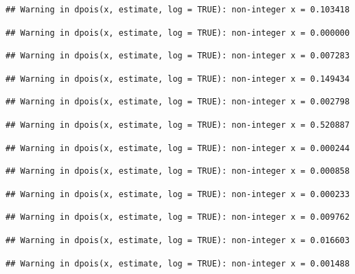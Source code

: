 \documentclass[]{article}
\begin{document}
\begin{verbatim}
## Warning in dpois(x, estimate, log = TRUE): non-integer x = 0.103418
\end{verbatim}

\begin{verbatim}
## Warning in dpois(x, estimate, log = TRUE): non-integer x = 0.000000
\end{verbatim}

\begin{verbatim}
## Warning in dpois(x, estimate, log = TRUE): non-integer x = 0.007283
\end{verbatim}

\begin{verbatim}
## Warning in dpois(x, estimate, log = TRUE): non-integer x = 0.149434
\end{verbatim}

\begin{verbatim}
## Warning in dpois(x, estimate, log = TRUE): non-integer x = 0.002798
\end{verbatim}

\begin{verbatim}
## Warning in dpois(x, estimate, log = TRUE): non-integer x = 0.520887
\end{verbatim}

\begin{verbatim}
## Warning in dpois(x, estimate, log = TRUE): non-integer x = 0.000244
\end{verbatim}

\begin{verbatim}
## Warning in dpois(x, estimate, log = TRUE): non-integer x = 0.000858
\end{verbatim}

\begin{verbatim}
## Warning in dpois(x, estimate, log = TRUE): non-integer x = 0.000233
\end{verbatim}

\begin{verbatim}
## Warning in dpois(x, estimate, log = TRUE): non-integer x = 0.009762
\end{verbatim}

\begin{verbatim}
## Warning in dpois(x, estimate, log = TRUE): non-integer x = 0.016603
\end{verbatim}

\begin{verbatim}
## Warning in dpois(x, estimate, log = TRUE): non-integer x = 0.001488
\end{verbatim}
\end{document}
